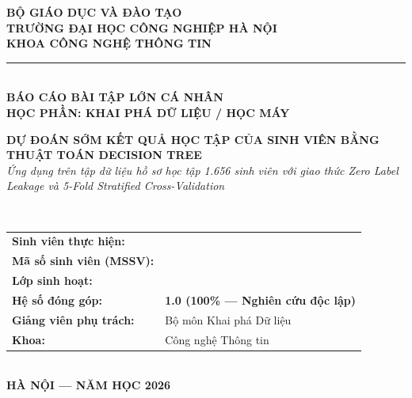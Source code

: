 \documentclass[12pt,a4paper]{article}
\begin{document}
\begin{titlepage}
    \begin{center}
        \textbf{\large BỘ GIÁO DỤC VÀ ĐÀO TẠO}\\[0.2cm]
        \textbf{\large TRƯỜNG ĐẠI HỌC CÔNG NGHIỆP HÀ NỘI}\\[0.2cm]
        \textbf{\large KHOA CÔNG NGHỆ THÔNG TIN}\\[0.3cm]
        \rule{0.6\textwidth}{1.5pt}\\[2.0cm]

        \textbf{\Large BÁO CÁO BÀI TẬP LỚN CÁ NHÂN}\\[0.3cm]
        \textbf{\large HỌC PHẦN: KHAI PHÁ DỮ LIỆU / HỌC MÁY}\\[1.5cm]

        \begin{minipage}{0.9\textwidth}
            \centering
            \textbf{\huge\color{primaryblue} DỰ ĐOÁN SỚM KẾT QUẢ HỌC TẬP CỦA SINH VIÊN BẰNG THUẬT TOÁN DECISION TREE}\\[0.5cm]
            \textit{\large Ứng dụng trên tập dữ liệu hồ sơ học tập 1.656 sinh viên với giao thức Zero Label Leakage và 5-Fold Stratified Cross-Validation}
        \end{minipage}\\[2.5cm]

        \begin{minipage}{0.85\textwidth}
            \large
            \begin{tabular}{ll}
                \textbf{Sinh viên thực hiện:} & \dotfill \\
                \textbf{Mã số sinh viên (MSSV):} & \dotfill \\
                \textbf{Lớp sinh hoạt:} & \dotfill \\
                \textbf{Hệ số đóng góp:} & \textbf{1.0 (100\% --- Nghiên cứu độc lập)} \\[0.4cm]
                \textbf{Giảng viên phụ trách:} & Bộ môn Khai phá Dữ liệu \\
                \textbf{Khoa:} & Công nghệ Thông tin
            \end{tabular}
        \end{minipage}\\[2.5cm]

        \vfill
        \textbf{\large HÀ NỘI --- NĂM HỌC 2026}
    \end{center}
\end{titlepage}
\end{document}
